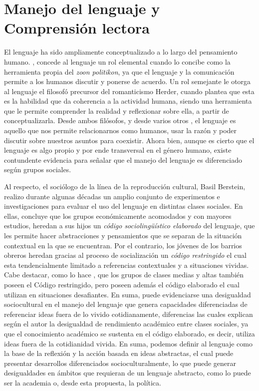 \documentclass[12pt,twoside]{templates/facsothesis}
\begin{document}
\hypertarget{manejo-del-lenguaje-y-comprensiuxf3n-lectora}{%
\section{Manejo del lenguaje y Comprensión lectora}\label{manejo-del-lenguaje-y-comprensiuxf3n-lectora}}

El lenguaje ha sido ampliamente conceptualizado a lo largo del pensamiento humano. \citet{aristotelesPolitica1988} , concede al lenguaje un rol elemental cuando lo concibe como la herramienta propia del \emph{zoon politikon}, ya que el lenguaje y la comunicación permite a los humanos discutir y ponerse de acuerdo. Un rol semejante le otorga al lenguaje el filosofó precursor del romanticismo Herder, cuando plantea que esta es la habilidad que da coherencia a la actividad humana, siendo una herramienta que le permite comprender la realidad y reflexionar sobre ella, a partir de conceptualizarla. Desde ambos filósofos, y desde varios otros \citep[ej.][]{echeverriaOntologiaLenguaje2011, garciaLENGUAJECOMOINSTRUMENTO2013}, el lenguaje es aquello que nos permite relacionarnos como humanos, usar la razón y poder discutir sobre nuestros asuntos para coexistir. Ahora bien, aunque es cierto que el lenguaje es algo propio y por ende transversal en el género humano, existe contundente evidencia para señalar que el manejo del lenguaje es diferenciado según grupos sociales.

Al respecto, el sociólogo de la línea de la reproducción cultural, Basil Berstein, realizo durante algunas décadas un amplio conjunto de experimentos e investigaciones para evaluar el uso del lenguaje en distintas clases sociales. En ellas, \citet{bernsteinCLASESSOCIALESLENGUAJE1985} concluye que los grupos económicamente acomodados y con mayores estudios, heredan a sus hijos un \emph{código sociolingüístico elaborado} del lenguaje, que les permite hacer abstracciones y pensamientos que se separan de la situación contextual en la que se encuentran. Por el contrario, los jóvenes de los barrios obreros heredan gracias al proceso de socialización un \emph{código restringido} el cual esta tendencialmente limitado a referencias contextuales y a situaciones vividas. Cabe destacar, como lo hace \citet{bernsteinPoderEducacionConciencia1988}, que los grupos de clases medias y altas también poseen el Código restringido, pero poseen además el código elaborado el cual utilizan en situaciones desafiantes. En suma, puede evidenciarse una desigualdad sociocultural en el manejo del lenguaje que genera capacidades diferenciadas de referenciar ideas fuera de lo vivido cotidianamente, diferencias las cuales explican según el autor la desigualdad de rendimiento académico entre clases sociales, ya que el conocimiento académico se sustenta en el código elaborado, es decir, utiliza ideas fuera de la cotidianidad vivida. En suma, podemos definir al lenguaje como la base de la reflexión y la acción basada en ideas abstractas, el cual puede presentar desarrollos diferenciados socioculturalmente, lo que puede generar desigualdades en ámbitos que requieran de un lenguaje abstracto, como lo puede ser la academia o, desde esta propuesta, la política.
\end{document}
